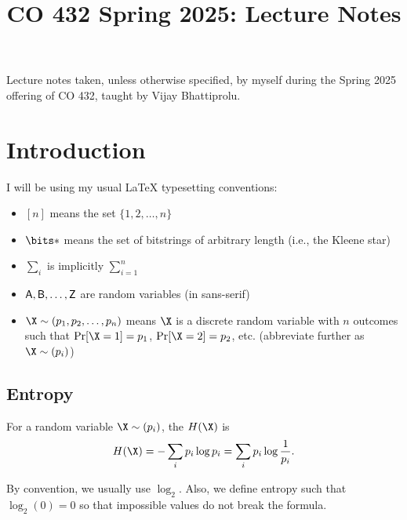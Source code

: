 \documentclass[class=co432,notes,tikz]{agony}
\title{CO 432 Spring 2025: Lecture Notes}
\begin{document}
\renewcommand{\contentsname}{CO 432 Spring 2025:\\{\huge Lecture Notes}}
\thispagestyle{firstpage}
\tableofcontents

Lecture notes taken, unless otherwise specified,
by myself during the Spring 2025 offering of CO 432,
taught by Vijay Bhattiprolu.

\begin{multicols}{2}
  \listoflecture
\end{multicols}

\chapter{Introduction}

\begin{notation}
  I will be using my usual \LaTeX{} typesetting conventions:
  \begin{itemize}[nosep]
    \item $[n]$ means the set $\{1,2,\dotsc,n\}$
    \item $\bits*$ means the set of bitstrings of arbitrary length (i.e., the Kleene star)
    \item $\sum_i$ is implicitly $\sum_{i=1}^n$
    \item $\mathsf A, \mathsf B, \dotsc, \mathsf Z$ are random variables (in sans-serif)
    \item $\X \sim (p_1,p_2,\dotsc,p_n)$ means $\X$ is a
          discrete random variable with $n$ outcomes
          such that $\Pr[\X = 1] = p_1$, $\Pr[\X=2] = p_2$, etc.
          (abbreviate further as $\X \sim (p_i)$)
  \end{itemize}
\end{notation}

\section{Entropy}


\begin{defn}[entropy]
  For a random variable $\X \sim (p_i)$,
  the  $H(\X)$ is
  \[ H(\X) = -\sum_i p_i \log p_i = \sum_i p_i \log \frac{1}{p_i}. \]
\end{defn}

\begin{convention}
  By convention, we usually use $\log_2$.
  Also, we define entropy such that $\log_2(0) = 0$ so that
  impossible values do not break the formula.
\end{convention}
\end{document}
